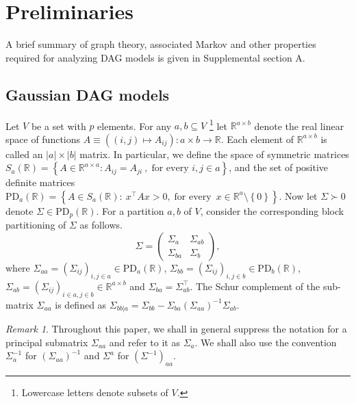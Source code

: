 \documentclass[12pt]{article}
\newcommand{\R}{\mathbb{R}}
\theoremstyle{plain}
\theoremstyle{definition}
\theoremstyle{remark}
\newtheorem{Rem}[theorem]{Remark}
\begin{document}
\section{Preliminaries}\label{sec:pre}

A brief summary of graph theory, associated Markov and other properties required for analyzing DAG models is given in Supplemental section A. 
\subsection{Gaussian DAG models}\label{sub:gdag}

Let $V$ be a set with $p$ elements. For any $a, b \subseteq V$ \footnote{Lowercase letters denote subsets of $V$.} let $\R^{a\times b}$ denote the real linear space of functions $A\equiv\left((i,j)\mapsto A_{ij}\right): a\times b\rightarrow \R$. Each element of $\R^{a\times b}$ is called an $|a|\times |b|$ matrix.  In particular, we define the space of symmetric matrices ${S}_a(\R)=\left\{A\in \R^{a\times a}: A_{ij}=A_{ji}~, \; \text{for every $i,j\in a$}\right\}$, and the set of positive definite matrices $
\mathrm{PD}_a(\R)=\left\{A\in {S}_a(\R):  ~x^{\top}Ax > 0, \; \text{for every} \: \; x\in\R^a\setminus\left\{0\right\}\right\}$.
 Now let $\Sigma\succ 0$ denote $\Sigma\in \mathrm{PD}_{p}(\R)$.  For a partition $a, b$ of $V$, consider the corresponding block partitioning of $\Sigma$ as follows.
 \[
 \Sigma=
 \left(
 \begin{matrix}
 \Sigma_{a}&\Sigma_{ab}\\
 \Sigma_{ba}&\Sigma_{b}
 \end{matrix}
 \right),
 \]
 where  $\Sigma_{aa}=(\Sigma_{ij})_{i,j\in a}\in \mathrm{PD}_a(\R)$, $\Sigma_{bb}=(\Sigma_{ij})_{i,j\in b}\in \mathrm{PD}_b(\R)$, $\Sigma_{ab}=(\Sigma_{ij})_{i\in a, j\in b}\in \R^{a\times b}$  and  $\Sigma_{ba}=\Sigma_{ab}^{\top}$. The Schur complement of the sub-matrix $\Sigma_{aa}$  is defined as  $\Sigma_{bb| a}=\Sigma_{bb}-\Sigma_{ba}(\Sigma_{aa})^{-1}\Sigma_{ab}$.
 \begin{Rem}
 Throughout this paper, we shall in general suppress the notation for a principal submatrix  $\Sigma_{aa}$ and refer to it as $\Sigma_a$. We shall also use the convention $\Sigma_a^{-1}$  for $(\Sigma_{aa})^{-1}$  and  $\Sigma^a$  for $(\Sigma^{-1})_{aa}$.
 \end{Rem}
%
\end{document}
